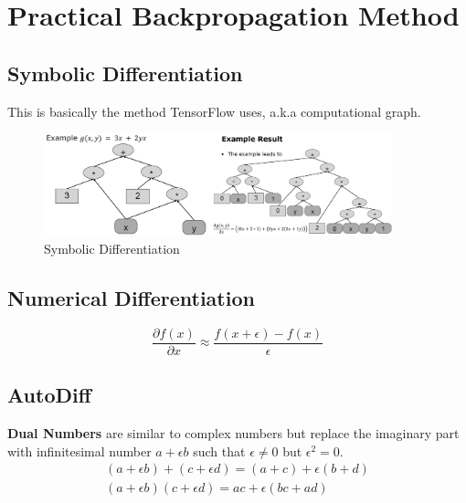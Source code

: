 \documentclass[a4paper]{article}
\begin{document}
\section{Practical Backpropagation Method}

\subsection{Symbolic Differentiation}

This is basically the method TensorFlow uses, a.k.a computational graph.
\begin{figure}[h]
	\centering
	\includegraphics[width=0.9\textwidth]{images/symbolicbp.png}
	\caption{Symbolic Differentiation}
	\label{fig:symbolicbp}
\end{figure}

\subsection{Numerical Differentiation}

\begin{equation}
	\frac{\partial f(x)}{\partial x} \approx \frac{f(x + \epsilon) - f(x)}{\epsilon}
\end{equation}

\subsection{AutoDiff}

\textbf{Dual Numbers} are similar to complex numbers but replace the imaginary part with infinitesimal number $a + \epsilon b$ such that $\epsilon \neq 0$ but $\epsilon^2 = 0$.
\begin{align}
	(a + \epsilon b) + (c + \epsilon d ) = (a + c ) + \epsilon (b + d) \\
	(a + \epsilon b)(c + \epsilon d ) = ac + \epsilon (bc + ad)
\end{align}
\end{document}
